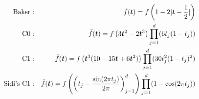 \documentclass[10pt,compress,xcolor={usenames,dvipsnames}]{beamer} %
\newcommand{\MLE}{\text{MLE}}
\newcommand{\vthetaMLE}{{\vtheta}_{\MLE}}
\begin{document}
\iffalse

\subsection{Algorithm - Bayesian Cubature}
\frame{
\frametitle{Automatic Bayesian Cubature}
\begin{algorithm}[H]
  \caption{Automatic Bayesian Cubature}\label{algorithm}
  \begin{algorithmic}[1]
    \Procedure{BayesCubature}{$f,\text{err}_{tol}$} \Comment{Integrate within the error threshold}
      \State $n \gets 2^8$
      \Do
        \State Generate Lattice points$(\vx_i)_{i=0}^{n-1}$
        \State Sample $(f(\vx_i))_{i=0}^{n-1}$
        \State Estimate optimal params $\vthetaMLE_n$
        \State Compute $\mathsf{C}_{\vthetaMLE, n}$
        \State Compute $\text{err}_{n}$
        \State $n\gets 2 \times n$
      \doWhile{$\text{err}_{n} > \text{err}_{tol}$}   \Comment{Iterate till error tolerance is met}
      \State Compute weights $(w_i)_{i=0}^{n-1}$
      \State Compute $\hmu_n$
      \State \textbf{return} $\hmu_n$ \Comment{Integral estimate $\hmu_n$}
    \EndProcedure
  \end{algorithmic}
\end{algorithm}
}

\fi







\iffalse
\begin{align*}
\text{Baker} & : & \tilde{f}(\boldsymbol{t})
= f\left(1-2|\boldsymbol{t}-\frac{1}{2}| \right)
\\
\text{C0} & : & \tilde{f}(\boldsymbol{t})
= f\left(3\boldsymbol{t}^2 - 2\boldsymbol{t}^3\right)\prod_{j=1}^d(6t_j(1-t_j))
\\
\text{C1} & : & \tilde{f}(\boldsymbol{t})
= f\left(\boldsymbol{t}^3(10-15\boldsymbol{t}+6\boldsymbol{t}^2)\right)\prod_{j=1}^d(30t_j^2(1-t_j)^2)
\\
\text{Sidi's C1} & : & \tilde{f}(\boldsymbol{t})
= f\left( \left( t_j- \frac{\sin(2\pi t_j)}{2\pi} \right)_{j=1}^d \right)\prod_{j=1}^d(1-\cos(2\pi t_j))
\end{align*}

\end{document}
